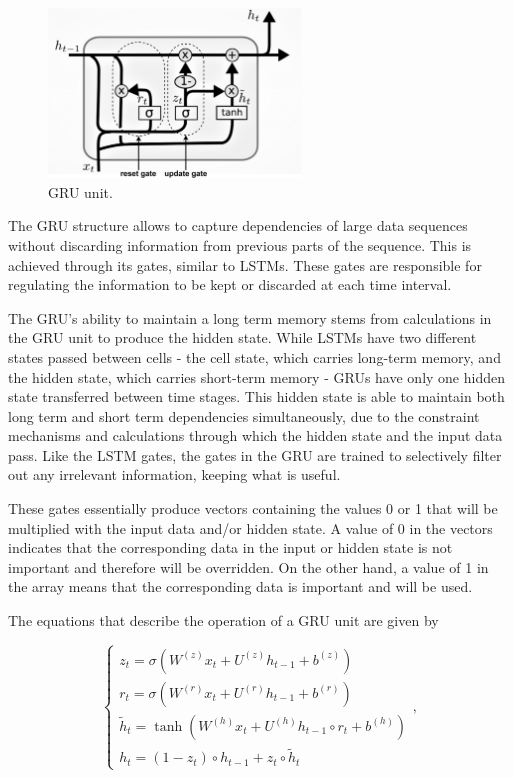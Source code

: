 \begin{figure}[h!]
    \centering
    \begin{center}
    \includegraphics[width=0.6\textwidth]{Images/GRU_cell_detailed.png}
    \caption{GRU unit.}
    \label{gru}
    \end{center}
\end{figure}


The \ac{GRU} structure allows to capture dependencies of large data sequences without discarding information from previous parts of the sequence. This is achieved through its gates, similar to \ac{LSTM}s. These gates are responsible for regulating the information to be kept or discarded at each time interval.

The \ac{GRU}'s ability to maintain a long term memory stems from calculations in the \ac{GRU} unit to produce the hidden state. While \ac{LSTM}s have two different states passed between cells - the cell state, which carries long-term memory, and the hidden state, which carries short-term memory - \ac{GRU}s have only one hidden state transferred between time stages. This hidden state is able to maintain both long term and short term dependencies simultaneously, due to the constraint mechanisms and calculations through which the hidden state and the input data pass.  Like the \ac{LSTM} gates, the gates in the \ac{GRU} are trained to selectively filter out any irrelevant information, keeping what is useful.

These gates essentially produce vectors containing the values 0 or 1 that will be multiplied with the input data and/or hidden state. A value of 0 in the vectors indicates that the corresponding data in the input or hidden state is not important and therefore will be overridden. On the other hand, a value of 1 in the array means that the corresponding data is important and will be used.


The equations that describe the operation of a \ac{GRU} unit are given by 

\begin{equation}
    \begin{cases} 
        
        z_t = \sigma(W^{(z)} x_t + U^{(z)} h_{t-1} + b^{(z)})\\
        r_t = \sigma(W^{(r)} x_t + U^{(r)} h_{t-1} + b^{(r)})\\
        \tilde{h}_t = \tanh(W^{(h)} x_t + U^{(h)} h_{t-1} \circ r_t + b^{(h)})\\
        h_t = (1-z_t) \circ h_{t-1} + z_t \circ \tilde{h}_t

    \end{cases} ,
\end{equation}


